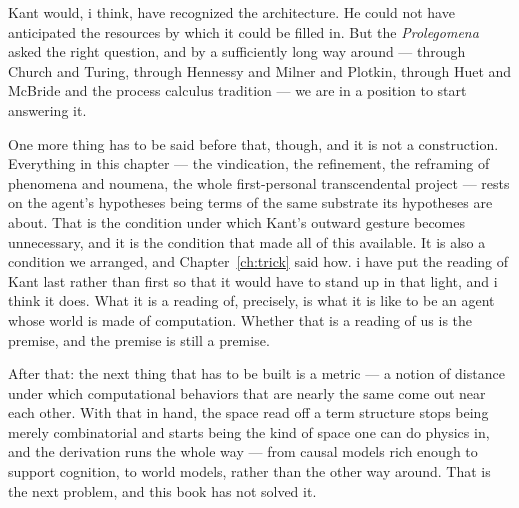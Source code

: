 Kant would, i think, have recognized the architecture.
He could not have anticipated the resources by which it could be
filled in.
But the \emph{Prolegomena} asked the right question, and by a
sufficiently long way around --- through Church and Turing, through
Hennessy and Milner and Plotkin, through Huet and McBride and the
process calculus tradition --- we are in a position to start
answering it.

One more thing has to be said before that, though, and it is not a
construction.
Everything in this chapter --- the vindication, the refinement, the
reframing of phenomena and noumena, the whole first-personal
transcendental project --- rests on the agent's hypotheses being
terms of the same substrate its hypotheses are about.
That is the condition under which Kant's outward gesture becomes
unnecessary, and it is the condition that made all of this
available.
It is also a condition we arranged, and
Chapter~\ref{ch:trick} said how.
i have put the reading of Kant last rather than first so that it
would have to stand up in that light, and i think it does.
What it is a reading of, precisely, is what it is like to be an
agent whose world is made of computation.
Whether that is a reading of us is the premise, and the premise is
still a premise.

After that:
the next thing that has to be built is a metric --- a notion of
distance under which computational behaviors that are nearly the
same come out near each other.
With that in hand, the space read off a term structure stops being
merely combinatorial and starts being the kind of space one can do
physics in, and the derivation runs the whole way --- from causal
models rich enough to support cognition, to world models, rather
than the other way around.
That is the next problem, and this book has not solved it.
